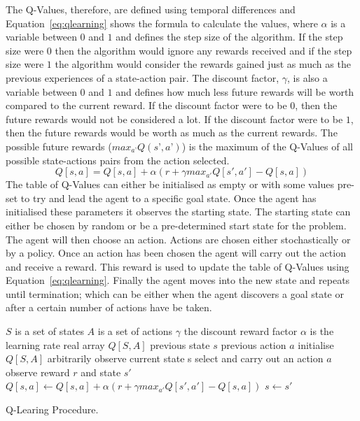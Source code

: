 The Q-Values, therefore, are defined using temporal differences and Equation~\ref{eq:qlearning} shows the formula to calculate the values, where $\alpha$ is a variable between $0$ and $1$ and defines the step size of the algorithm. If the step size were $0$ then the algorithm would ignore any rewards received and if the step size were $1$ the algorithm would consider the rewards gained just as much as the previous experiences of a state-action pair. The discount factor, $\gamma$, is also a variable between $0$ and $1$ and defines how much less future rewards will be worth compared to the current reward. If the discount factor were to be $0$, then the future rewards would not be considered a lot. If the discount factor were to be $1$, then the future rewards would be worth as much as the current rewards. The possible future rewards ($max_{a’}Q(s’,a’)$) is the maximum of the Q-Values of all possible state-actions pairs from the action selected.
\begin{equation} \label{eq:qlearning}
Q[s,a] = Q[s,a] + {\alpha}(r+ {\gamma}max_{a'} Q[s',a'] - Q[s,a])
\end{equation}
The table of Q-Values can either be initialised as empty or with some values pre-set to try and lead the agent to a specific goal state. Once the agent has initialised these parameters it observes the starting state. The starting state can either be chosen by random or be a pre-determined start state for the problem. The agent will then choose an action. Actions are chosen either stochastically or by a policy. Once an action has been chosen the agent will carry out the action and receive a reward. This reward is used to update the table of Q-Values using Equation~\ref{eq:qlearning}. Finally the agent moves into the new state and repeats until termination; which can be either when the agent discovers a goal state or after a certain number of actions have be taken.
\begin{algorithm}
\begin{algorithmic}[1]
\Require
 	\Statex $S$ is a set of states
 	\Statex $A$ is a set of actions
 	\Statex $\gamma$ the discount reward factor
 	\Statex $\alpha$ is the learning rate
	\State real array $Q[S,A]$
	\State previous state $s$
	\State previous action $a$
	\State initialise $Q[S,A]$ arbitrarily
	\State observe current state s
	\Repeat
		\State select and carry out an action $a$
		\State observe reward $r$ and state $s'$
		\State $Q[s,a] \gets Q[s,a]+\alpha(r+\gamma max_{a'}Q[s',a']-Q[s,a])$
		\State $s \gets s'$
\EndProcedure
\end{algorithmic}
\caption{Q-Learing Procedure.}\label{alg:qlearning}
\end{algorithm}


